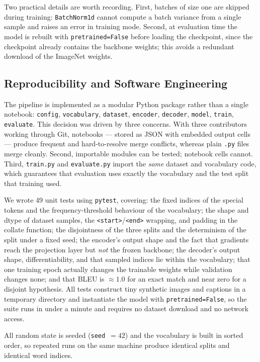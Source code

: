 \documentclass{article}
\begin{document}
Two practical details are worth recording. First, batches of size one are skipped
during training: \texttt{BatchNorm1d} cannot compute a batch variance from a
single sample and raises an error in training mode. Second, at evaluation time
the model is rebuilt with \texttt{pretrained=False} before loading the
checkpoint, since the checkpoint already contains the backbone weights; this
avoids a redundant download of the ImageNet weights.

\subsection{Reproducibility and Software Engineering}

The pipeline is implemented as a modular Python package rather than a single
notebook: \texttt{config}, \texttt{vocabulary}, \texttt{dataset},
\texttt{encoder}, \texttt{decoder}, \texttt{model}, \texttt{train},
\texttt{evaluate}. This decision was driven by three concerns. With three
contributors working through Git, notebooks --- stored as JSON with embedded
output cells --- produce frequent and hard-to-resolve merge conflicts, whereas
plain \texttt{.py} files merge cleanly. Second, importable modules can be tested;
notebook cells cannot. Third, \texttt{train.py} and \texttt{evaluate.py} import
the \emph{same} dataset and vocabulary code, which guarantees that evaluation
uses exactly the vocabulary and the test split that training used.

We wrote 49 unit tests using \texttt{pytest}, covering: the fixed indices of the
special tokens and the frequency-threshold behaviour of the vocabulary; the shape
and dtype of dataset samples, the \texttt{<start>}/\texttt{<end>} wrapping, and
padding in the collate function; the disjointness of the three splits and the
determinism of the split under a fixed seed; the encoder's output shape and the
fact that gradients reach the projection layer but \emph{not} the frozen
backbone; the decoder's output shape, differentiability, and that sampled indices
lie within the vocabulary; that one training epoch actually changes the trainable
weights while validation changes none; and that BLEU is $\approx 1.0$ for an
exact match and near zero for a disjoint hypothesis. All tests construct tiny
synthetic images and captions in a temporary directory and instantiate the model
with \texttt{pretrained=False}, so the suite runs in under a minute and requires
no dataset download and no network access.

All random state is seeded (\texttt{seed}~$=42$) and the vocabulary is built in
sorted order, so repeated runs on the same machine produce identical splits and
identical word indices.
\end{document}
